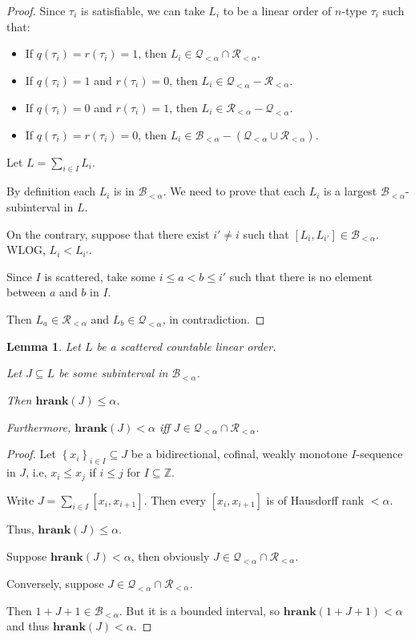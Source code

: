 \documentclass{article}
\newtheorem{lemma}{Lemma}
\newcommand{\braces}[1]{\left\{ {#1} \right\}}
\newcommand{\setcomp}[1]{\braces{#1}}
\newcommand{\hrank}[1]{\mathbf{hrank}\left( #1 \right)}
\newcommand{\ZZ}{\mathbb{Z}}
\begin{document}
\begin{proof}
  Since $\tau_i$ is satisfiable, we can take $L_i$ to be a linear order of $n$-type
  $\tau_i$ such that:

  \begin{itemize}
    \item If $q(\tau_i) = r(\tau_i) = 1$, then $L_i \in \mathcal{Q}_{< \alpha} \cap \mathcal{R}_{< \alpha}$.
    \item If $q(\tau_i) = 1$ and $r(\tau_i) = 0$, then $L_i \in \mathcal{Q}_{< \alpha} - \mathcal{R}_{< \alpha}$.
    \item If $q(\tau_i) = 0$ and $r(\tau_i) = 1$, then $L_i \in \mathcal{R}_{< \alpha} - \mathcal{Q}_{< \alpha}$.
    \item If $q(\tau_i) = r(\tau_i) = 0$, then $L_i \in \mathcal{B}_{< \alpha} - (\mathcal{Q}_{< \alpha} \cup \mathcal{R}_{< \alpha})$.
  \end{itemize}

  Let $L = \sum_{i \in I} L_i$.
  
  By definition each $L_i$ is in $\mathcal{B}_{< \alpha}$. We need to prove
  that each $L_i$ is a largest $\mathcal{B}_{< \alpha}$-subinterval in $L$.

  On the contrary, suppose that there exist $i' \ne i$ such that $[L_i, L_{i'}] \in \mathcal{B}_{< \alpha}$.
  WLOG, $L_i < L_{i'}$.
  
  Since $I$ is scattered, take some $i \le a < b \le i'$ such that 
  there is no element between $a$ and $b$ in $I$.

  Then $L_a \in \mathcal{R}_{< \alpha}$ and $L_b \in \mathcal{Q}_{< \alpha}$, in contradiction.
\end{proof}

\begin{lemma}
  Let $L$ be a scattered countable linear order.

  Let $J \subseteq L$ be some subinterval in $\mathcal{B}_{< \alpha}$.

  Then $\hrank{J} \le \alpha$.

  Furthermore, $\hrank{J} < \alpha$ iff $J \in \mathcal{Q_{< \alpha}} \cap \mathcal{R_{< \alpha}}$.
\end{lemma}

\begin{proof}
  Let $\setcomp{x_i}_{i \in I} \subseteq J$ be a bidirectional, cofinal, weakly monotone $I$-sequence in $J$, i.e,
  $x_i \le x_j$ if $i \le j$ for $I \subseteq \ZZ$.

  Write $J = \sum_{i \in I} [x_i, x_{i+1}]$. Then every $[x_i, x_{i+1}]$ is of Hausdorff rank $< \alpha$.

  Thus, $\hrank{J} \le \alpha$.

  Suppose $\hrank{J} < \alpha$, then obviously $J \in \mathcal{Q_{< \alpha}} \cap \mathcal{R_{< \alpha}}$.

  Conversely, suppose $J \in \mathcal{Q_{< \alpha}} \cap \mathcal{R_{< \alpha}}$.

  Then $1 + J + 1 \in \mathcal{B}_{< \alpha}$. But it is a bounded interval,
  so $\hrank{1 + J + 1} < \alpha$ and thus $\hrank{J} < \alpha$.
\end{proof}
\end{document}
